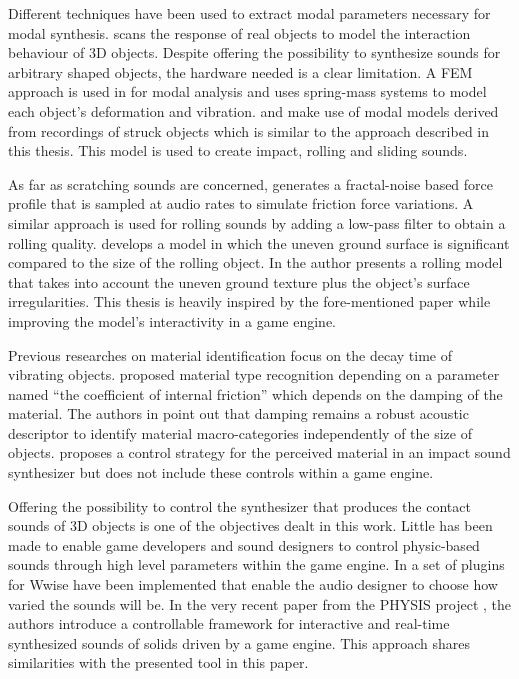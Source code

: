 Different techniques have been used to extract modal parameters necessary for modal synthesis. \cite{pai2001scanning} scans the response of real objects to model the interaction behaviour of 3D objects. Despite offering the possibility to synthesize sounds for arbitrary shaped objects, the hardware needed is a clear limitation. A \gls{FEM} approach is used in \cite{o2002synthesizing} for modal analysis and \cite{raghuvanshi2006interactive} uses spring-mass systems to model each object's deformation and vibration.\cite{van2001foleyautomatic} and \cite{lloyd2011sound} make use of modal models derived from recordings of struck objects which is similar to the approach described in this thesis. This model is used to create impact, rolling and sliding sounds.

As far as scratching sounds are concerned, \cite{van2001foleyautomatic} generates a fractal-noise based force profile that is sampled at audio rates to simulate friction force variations. A similar approach is used for rolling sounds by adding a low-pass filter to obtain a rolling quality. \cite{rath2003expressive} develops a model in which the uneven ground surface is significant compared to the size of the rolling object. In \cite{farnell2010designing} the author presents a rolling model that takes into account the uneven ground texture plus the object's surface irregularities. This thesis is heavily inspired by the fore-mentioned paper while improving the model's interactivity in a game engine.

Previous researches on material identification focus on the decay time of vibrating objects. \cite{wildes1988recovering} proposed material type recognition depending on a parameter named ``the coefficient of internal friction'' which depends on the damping of the material. The authors in \cite{giordano2006material} point out that damping remains a robust acoustic descriptor to identify material macro-categories independently of the size of objects. \cite{aramaki2011controlling} proposes a control strategy for the perceived material in an impact sound synthesizer but does not include these controls within a game engine.

Offering the possibility to control the synthesizer that produces the contact sounds of 3D objects is one of the objectives dealt in this work. Little has been made to enable game developers and sound designers to control physic-based sounds through high level parameters within the game engine. In \cite{lloyd2011sound} a set of plugins for Wwise \cite{bib:wwise} have been implemented that enable the audio designer to choose how varied the sounds will be. In the very recent paper \cite{pruvost2015perception} from the PHYSIS project \cite{bib:physis}, the authors introduce a  controllable framework for interactive and real-time synthesized sounds of solids driven by a game engine. This approach shares similarities with the presented tool in this paper.

